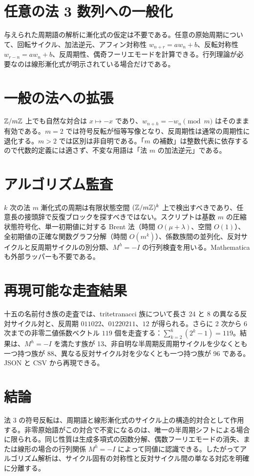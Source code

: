 \documentclass[11pt,a4paper]{article}
\begin{document}
\section{任意の法 3 数列への一般化}
与えられた周期語の解析に漸化式の仮定は不要である。任意の原始周期について、回転サイクル、加法逆元、アフィン対称性 \(w_{n+r}=aw_n+b\)、反転対称性 \(w_{r-n}=aw_n+b\)、反周期性、偶奇フーリエモードを計算できる。行列理論が必要なのは線形漸化式が明示されている場合だけである。
\section{一般の法への拡張}
\(\mathbb Z/m\mathbb Z\) 上でも自然な対合は \(x\mapsto-x\) であり、\(w_{n+h}=-w_n\pmod m\) はそのまま有効である。\(m=2\) では符号反転が恒等写像となり、反周期性は通常の周期性に退化する。\(m>2\) では区別は非自明である。「\(m\) の補数」は整数代表に依存するので代数的定義には適さず、不変な用語は「法 \(m\) の加法逆元」である。
\section{アルゴリズム監査}
\(k\) 次の法 \(m\) 漸化式の周期は有限状態空間 \((\mathbb Z/m\mathbb Z)^k\) 上で検出すべきであり、任意長の接頭辞で反復ブロックを探すべきではない。スクリプトは基数 \(m\) の圧縮状態符号化、単一初期値に対する Brent 法（時間 \(O(\mu+\lambda)\)、空間 \(O(1)\)）、全初期値の正確な関数グラフ分解（時間 \(O(m^k)\)）、係数族間の並列化、反対サイクルと反周期サイクルの別分類、\(M^h=-I\) の行列検査を用いる。Mathematica も外部ラッパーも不要である。
\section{再現可能な走査結果}
十五の名前付き族の走査では、tritetranacci 族について長さ 24 と 8 の異なる反対サイクル対と、反周期 \(011022\)、\(01220211\)、\(12\) が得られる。さらに 2 次から 6 次までの非零二値係数ベクトル \(119\) 個を走査する：\(\sum_{k=2}^{6}(2^k-1)=119\)。結果は、\(M^h=-I\) を満たす族が 13、非自明な半周期反周期サイクルを少なくとも一つ持つ族が 88、異なる反対サイクル対を少なくとも一つ持つ族が 96 である。JSON と CSV から再現できる。
\section*{結論}
法 3 の符号反転は、周期語と線形漸化式のサイクル上の構造的対合として作用する。非零原始語がこの対合で不変になるのは、唯一の半周期シフトによる場合に限られる。同じ性質は生成多項式の因数分解、偶数フーリエモードの消失、または線形の場合の行列関係 \(M^h=-I\) によって同値に認識できる。したがってアルゴリズム解析は、サイクル固有の対称性と反対サイクル間の単なる対応を明確に分離する。
\end{document}
